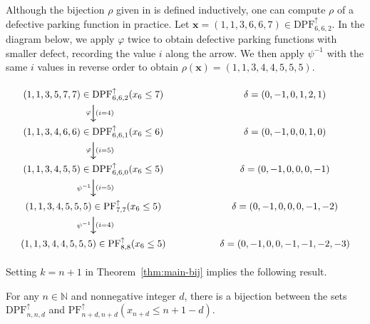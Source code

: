 \documentclass[11pt,reqno]{BICA}
\theoremstyle{definition}
\newcommand{\NDPF}{\mathrm{PF}^{\uparrow}}
\newcommand{\NDDPF}{\mathrm{DPF}^\uparrow}
\newcommand{\x}{\mathbf{x}}
\newcommand{\NN}{\mathbb{N}}
\begin{document}
\begin{example}
    Although the bijection $\rho$ given in  is defined inductively, one can compute $\rho$ of a defective parking function in practice. Let $\x=(1,1,3,6,6,7)\in\NDDPF_{6,6,2}$. In the diagram below, we apply $\varphi$ twice to obtain defective parking functions with smaller defect, recording the value $i$ along the arrow. We then apply $\psi^{-1}$ with the same $i$ values in reverse order to obtain $\rho(\x)=(1,1,3,4,4,5,5,5)$.


\[
\resizebox{\textwidth}{!}{
\begin{tikzcd}[ampersand replacement=\&]
	{(1,1,3,5,7,7)\in\NDDPF_{6,6,2}(x_6\leq7)} \&\& {\delta=(0,-1,0,1,2,1)} \\
	{(1,1,3,4,6,6)\in\NDDPF_{6,6,1}(x_6\leq6)} \&\& {\delta=(0,-1,0,0,1,0)} \\
	{(1,1,3,4,5,5)\in\NDDPF_{6,6,0}(x_6\leq5)} \&\& {\delta=(0,-1,0,0,0,-1)} \\
	{(1,1,3,4,5,5,5)\in\NDPF_{7,7}(x_6\leq5)} \&\& {\delta=(0,-1,0,0,0,-1,-2)} \\
	{(1,1,3,4,4,5,5,5)\in\NDPF_{8,8}(x_6\leq5)} \&\& {\delta=(0,-1,0,0,-1,-1,-2,-3)}
	\arrow["{(i=4)}", from=1-1, to=2-1]
	\arrow["\varphi"', from=1-1, to=2-1]
	\arrow["{(i=5)}", from=2-1, to=3-1]
	\arrow["\varphi"', from=2-1, to=3-1]
	\arrow["{(i=5)}", from=3-1, to=4-1]
	\arrow["{\psi^{-1}}"', from=3-1, to=4-1]
	\arrow["{(i=4)}", from=4-1, to=5-1]
	\arrow["{\psi^{-1}}"', from=4-1, to=5-1]
\end{tikzcd}
}
\]

\end{example}

Setting $k=n+1$ in Theorem~\ref{thm:main-bij} implies the following result.  

\begin{corollary}\label{cor:n=m}
    For any $n\in\NN$ and nonnegative integer $d$, there is a bijection between the sets $\NDDPF_{n,n,d}$ and $\NDPF_{n+d,n+d}(x_{n+d} \leq n+1-d)$. 
\end{corollary}
\end{document}

